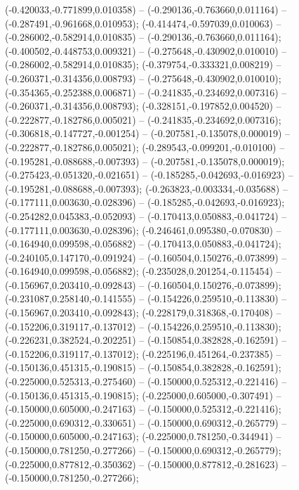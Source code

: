  (-0.420033,-0.771899,0.010358) -- (-0.290136,-0.763660,0.011164) -- (-0.287491,-0.961668,0.010953);
 (-0.414474,-0.597039,0.010063) -- (-0.286002,-0.582914,0.010835) -- (-0.290136,-0.763660,0.011164);
 (-0.400502,-0.448753,0.009321) -- (-0.275648,-0.430902,0.010010) -- (-0.286002,-0.582914,0.010835);
 (-0.379754,-0.333321,0.008219) -- (-0.260371,-0.314356,0.008793) -- (-0.275648,-0.430902,0.010010);
 (-0.354365,-0.252388,0.006871) -- (-0.241835,-0.234692,0.007316) -- (-0.260371,-0.314356,0.008793);
 (-0.328151,-0.197852,0.004520) -- (-0.222877,-0.182786,0.005021) -- (-0.241835,-0.234692,0.007316);
 (-0.306818,-0.147727,-0.001254) -- (-0.207581,-0.135078,0.000019) -- (-0.222877,-0.182786,0.005021);
 (-0.289543,-0.099201,-0.010100) -- (-0.195281,-0.088688,-0.007393) -- (-0.207581,-0.135078,0.000019);
 (-0.275423,-0.051320,-0.021651) -- (-0.185285,-0.042693,-0.016923) -- (-0.195281,-0.088688,-0.007393);
 (-0.263823,-0.003334,-0.035688) -- (-0.177111,0.003630,-0.028396) -- (-0.185285,-0.042693,-0.016923);
 (-0.254282,0.045383,-0.052093) -- (-0.170413,0.050883,-0.041724) -- (-0.177111,0.003630,-0.028396);
 (-0.246461,0.095380,-0.070830) -- (-0.164940,0.099598,-0.056882) -- (-0.170413,0.050883,-0.041724);
 (-0.240105,0.147170,-0.091924) -- (-0.160504,0.150276,-0.073899) -- (-0.164940,0.099598,-0.056882);
 (-0.235028,0.201254,-0.115454) -- (-0.156967,0.203410,-0.092843) -- (-0.160504,0.150276,-0.073899);
 (-0.231087,0.258140,-0.141555) -- (-0.154226,0.259510,-0.113830) -- (-0.156967,0.203410,-0.092843);
 (-0.228179,0.318368,-0.170408) -- (-0.152206,0.319117,-0.137012) -- (-0.154226,0.259510,-0.113830);
 (-0.226231,0.382524,-0.202251) -- (-0.150854,0.382828,-0.162591) -- (-0.152206,0.319117,-0.137012);
 (-0.225196,0.451264,-0.237385) -- (-0.150136,0.451315,-0.190815) -- (-0.150854,0.382828,-0.162591);
 (-0.225000,0.525313,-0.275460) -- (-0.150000,0.525312,-0.221416) -- (-0.150136,0.451315,-0.190815);
 (-0.225000,0.605000,-0.307491) -- (-0.150000,0.605000,-0.247163) -- (-0.150000,0.525312,-0.221416);
 (-0.225000,0.690312,-0.330651) -- (-0.150000,0.690312,-0.265779) -- (-0.150000,0.605000,-0.247163);
 (-0.225000,0.781250,-0.344941) -- (-0.150000,0.781250,-0.277266) -- (-0.150000,0.690312,-0.265779);
 (-0.225000,0.877812,-0.350362) -- (-0.150000,0.877812,-0.281623) -- (-0.150000,0.781250,-0.277266);
